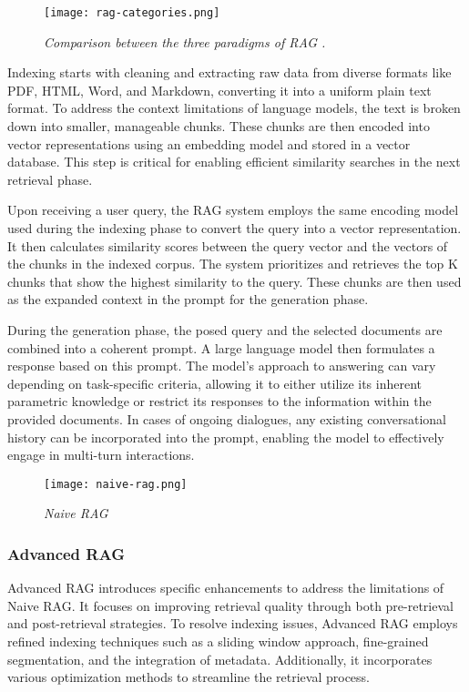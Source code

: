 \begin{figure}[H]
    \centering
    \texttt{[image: rag-categories.png]}
    \caption{
        \it{ Comparison between the three paradigms of RAG \cite{gao2024retrievalaugmented}.}
    }
    \label{fig:rag-categories}
\end{figure}

Indexing starts with cleaning and extracting raw data from diverse formats like PDF, HTML, Word, and Markdown, converting it into a uniform plain text format. To address the context limitations of language models, the text is broken down into smaller, manageable chunks. These chunks are then encoded into vector representations using an embedding model and stored in a vector database. This step is critical for enabling efficient similarity searches in the next retrieval phase.

Upon receiving a user query, the RAG system employs the same encoding model used during the indexing phase to convert the query into a vector representation. It then calculates similarity scores between the query vector and the vectors of the chunks in the indexed corpus. The system prioritizes and retrieves the top K chunks that show the highest similarity to the query. These chunks are then used as the expanded context in the prompt for the generation phase.

During the generation phase, the posed query and the selected documents are combined into a coherent prompt. A large language model then formulates a response based on this prompt. The model's approach to answering can vary depending on task-specific criteria, allowing it to either utilize its inherent parametric knowledge or restrict its responses to the information within the provided documents. In cases of ongoing dialogues, any existing conversational history can be incorporated into the prompt, enabling the model to effectively engage in multi-turn interactions.

\begin{figure}[H]
    \centering
    \texttt{[image: naive-rag.png]}
    \caption{
        \it{Naive RAG}
    }
    \label{fig:naive-rag}
\end{figure}

\subsubsection*{Advanced RAG}

Advanced RAG introduces specific enhancements to address the limitations of Naive RAG. It focuses on improving retrieval quality through both pre-retrieval and post-retrieval strategies. To resolve indexing issues, Advanced RAG employs refined indexing techniques such as a sliding window approach, fine-grained segmentation, and the integration of metadata. Additionally, it incorporates various optimization methods to streamline the retrieval process.

